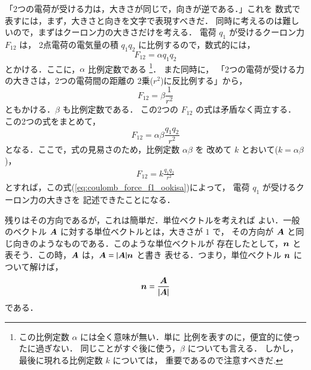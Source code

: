         「2つの電荷が受ける力は，大きさが同じで，向きが逆である．」これを
        数式で表すには，まず，大きさと向きを文字で表現すべきだ．
        同時に考えるのは難しいので，まずはクーロン力の大きさだけを考える．
        電荷 $q_{1}$ が受けるクーロン力 $F_{12}$ は，
        2点電荷の電気量の積 $q_{1}q_{2}$ に比例するので，数式的には，
            \begin{equation*}
                F_{12} = \alpha q_{1}q_{2}
            \end{equation*}
        とかける．ここに，$\alpha$ 比例定数である
            \footnote{
                この比例定数 $\alpha$ には全く意味が無い．単に
                比例を表すのに，便宜的に使ったに過ぎない．
                同じことがすぐ後に使う，$\beta$ についても言える．
                しかし，最後に現れる比例定数 $k$ については，
                重要であるので注意すべきだ.
            }．
         また同時に，
        「2つの電荷が受ける力の大きさは，2つの電荷間の距離の
        2乗($r^{2}$)に反比例する」から，
            \begin{equation*}
                F_{12} = \beta \frac{1}{r^{2}}
            \end{equation*}
        ともかける．$\beta$ も比例定数である．
        この2つの $F_{12}$ の式は矛盾なく両立する．
        この2つの式をまとめて，
            \begin{equation*}
                F_{12} = \alpha \beta \frac{q_{1}q_{2}}{r^{2}}
            \end{equation*}
        となる．ここで，式の見易さのため，比例定数 $\alpha \beta$ を
        改めて $k$ とおいて($k=\alpha \beta$)，
            \begin{align}\label{eq:coulomb_force_f1_ookisa}
                F_{12} = k \frac{q_{1}q_{2}}{r^{2}}
            \end{align}
        とすれば，この式(\ref{eq:coulomb_force_f1_ookisa})によって，
        電荷 $q_{1}$ が受けるクーロン力の大きさを
        記述できたことになる．

        残りはその方向であるが，これは簡単だ．単位ベクトルを考えれば
        よい．一般のベクトル $\boldsymbol{A}$ に対する単位ベクトルとは，大きさが $1$ で，
        その方向が $\boldsymbol{A}$ と同じ向きのようなものである．このような単位ベクトルが
        存在したとして，$\boldsymbol{n}$ と表そう．この時，$\boldsymbol{A}$ は，$\boldsymbol{A}=|\boldsymbol{A}|\boldsymbol{n}$ と書き
        表せる．つまり，単位ベクトル $\boldsymbol{n}$ について解けば，
            \begin{equation*}
                \boldsymbol{n} = \frac{\boldsymbol{A}}{|\boldsymbol{A}|}
            \end{equation*}
        である．

